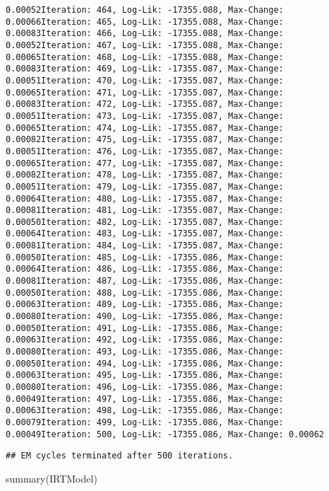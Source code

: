 \documentclass[
]{article}
\newenvironment{Shaded}{\begin{snugshade}}{\end{snugshade}}
\newcommand{\FunctionTok}[1]{\textcolor[rgb]{0.00,0.00,0.00}{#1}}
\newcommand{\NormalTok}[1]{#1}
\begin{document}
\begin{verbatim}
0.00052Iteration: 464, Log-Lik: -17355.088, Max-Change: 0.00066Iteration: 465, Log-Lik: -17355.088, Max-Change: 0.00083Iteration: 466, Log-Lik: -17355.088, Max-Change: 0.00052Iteration: 467, Log-Lik: -17355.088, Max-Change: 0.00065Iteration: 468, Log-Lik: -17355.088, Max-Change: 0.00083Iteration: 469, Log-Lik: -17355.087, Max-Change: 0.00051Iteration: 470, Log-Lik: -17355.087, Max-Change: 0.00065Iteration: 471, Log-Lik: -17355.087, Max-Change: 0.00083Iteration: 472, Log-Lik: -17355.087, Max-Change: 0.00051Iteration: 473, Log-Lik: -17355.087, Max-Change: 0.00065Iteration: 474, Log-Lik: -17355.087, Max-Change: 0.00082Iteration: 475, Log-Lik: -17355.087, Max-Change: 0.00051Iteration: 476, Log-Lik: -17355.087, Max-Change: 0.00065Iteration: 477, Log-Lik: -17355.087, Max-Change: 0.00082Iteration: 478, Log-Lik: -17355.087, Max-Change: 0.00051Iteration: 479, Log-Lik: -17355.087, Max-Change: 0.00064Iteration: 480, Log-Lik: -17355.087, Max-Change: 0.00081Iteration: 481, Log-Lik: -17355.087, Max-Change: 0.00050Iteration: 482, Log-Lik: -17355.087, Max-Change: 0.00064Iteration: 483, Log-Lik: -17355.087, Max-Change: 0.00081Iteration: 484, Log-Lik: -17355.087, Max-Change: 0.00050Iteration: 485, Log-Lik: -17355.086, Max-Change: 0.00064Iteration: 486, Log-Lik: -17355.086, Max-Change: 0.00081Iteration: 487, Log-Lik: -17355.086, Max-Change: 0.00050Iteration: 488, Log-Lik: -17355.086, Max-Change: 0.00063Iteration: 489, Log-Lik: -17355.086, Max-Change: 0.00080Iteration: 490, Log-Lik: -17355.086, Max-Change: 0.00050Iteration: 491, Log-Lik: -17355.086, Max-Change: 0.00063Iteration: 492, Log-Lik: -17355.086, Max-Change: 0.00080Iteration: 493, Log-Lik: -17355.086, Max-Change: 0.00050Iteration: 494, Log-Lik: -17355.086, Max-Change: 0.00063Iteration: 495, Log-Lik: -17355.086, Max-Change: 0.00080Iteration: 496, Log-Lik: -17355.086, Max-Change: 0.00049Iteration: 497, Log-Lik: -17355.086, Max-Change: 0.00063Iteration: 498, Log-Lik: -17355.086, Max-Change: 0.00079Iteration: 499, Log-Lik: -17355.086, Max-Change: 0.00049Iteration: 500, Log-Lik: -17355.086, Max-Change: 0.00062
\end{verbatim}

\begin{verbatim}
## EM cycles terminated after 500 iterations.
\end{verbatim}

\begin{Shaded}
\begin{Highlighting}[]
\FunctionTok{summary}\NormalTok{(IRTModel)}
\end{Highlighting}
\end{Shaded}
\end{document}
